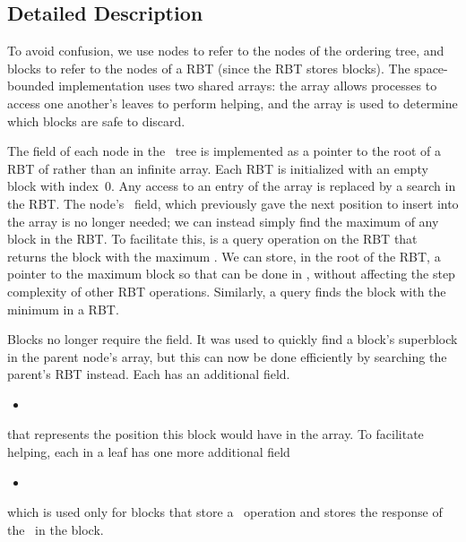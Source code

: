
\subsection{Detailed Description}
\label{reducing-details}


\renewcommand{\algorithmiccomment}[1]{\hfill\eqparbox{COMMENTSINGLEAPP}{\com\ #1}}

To avoid confusion, we use nodes to refer to the nodes of the ordering tree, and blocks to refer
to the nodes of a RBT (since the RBT stores blocks).
The space-bounded implementation uses two  shared arrays:
the  array allows processes to access one another's leaves to perform helping, and
the  array is used to determine which blocks are safe to discard.

The  field of each node in the \ordering\ tree is implemented as a pointer to the root of a RBT of  rather than an infinite array.  
Each RBT is initialized with an empty block with index~0.
Any access to an entry of the  array is replaced by a search in the RBT.
The node's \head\ field, which previously gave the next position to insert into the  array is no
longer needed; we can instead simply find the maximum  of any block in the RBT.
To facilitate this,  is a query operation on the RBT that 
returns the block with the maximum .
We can store, in the root of the RBT, a pointer to the maximum block so that 
can be done in , without affecting the step complexity of other RBT operations.
Similarly, a  query finds the block with the minimum  in a RBT.

Blocks no longer require the  field.  It was used to quickly find a block's 
superblock in the parent node's  array, but this can now be done efficiently 
by searching the parent's  RBT instead.
Each  has an additional field.
\begin{itemize}
\item {}  
\end{itemize}
that represents the position this block would have in the  array.
To facilitate helping, each  in a leaf has one more additional field 
\begin{itemize}
\item {} 
\end{itemize}
which is used only for blocks that store a \dequeue\ operation and stores the response of the \dequeue\ in the block.


